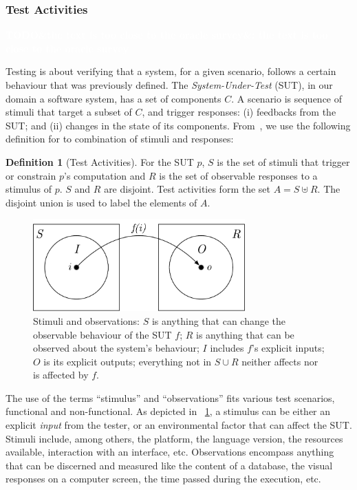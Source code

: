 \documentclass[a4paper,11pt]{sdm_internship}
\newcommand{\todo}[1]{\colorbox{Red!75}{\textcolor{white}{\textbf{TODO\ifx&#1&\else: #1\fi}}}}
\theoremstyle{definition}
\newtheorem{definition}{Definition}[section]
\begin{document}
\subsubsection{Test Activities}%
\label{sssec:test_activities}
\todo{the text is too close to the oracle survey}

Testing is about verifying that a system, for a given scenario, follows a certain behaviour that was previously defined.
The \emph{System-Under-Test} (SUT), in our domain a software system, has a set of components $C$.
A scenario is sequence of stimuli that target a subset of $C$, and trigger responses: (i) feedbacks from the SUT\@; and (ii) changes in the state of its components.
From~\cite{barr2015oracle}, we use the following definition for to combination of stimuli and responses:

\begin{definition}[Test Activities]
  For the SUT $p$, $S$ is the set of stimuli that trigger or constrain $p$'s computation and $R$ is the set of observable responses to a stimulus of $p$.
  $S$ and $R$ are disjoint.
  Test activities form the set $A = S\uplus{}R$.
  The disjoint union is used to label the elements of $A$.
\end{definition}

\begin{figure}
  \centering
  \includegraphics[width=22em]{stim_and_obs}
  \caption{Stimuli and observations: $S$ is anything that can change the observable behaviour of the SUT $f$; $R$ is anything that can be observed about the system's behaviour; $I$ includes $f$'s explicit inputs; $O$ is its explicit outputs; everything not in $S \cup R$ neither affects nor is affected by $f$.}%
  \label{fig:test_activity}
\end{figure}

The use of the terms ``stimulus'' and ``observations'' fits various test scenarios, functional and non-functional.
As depicted in \figurename~\ref{fig:test_activity}, a stimulus can be either an explicit \emph{input} from the tester, or an environmental factor that can affect the SUT\@.
Stimuli include, among others, the platform, the language version, the resources available, interaction with an interface, etc.
Observations encompass anything that can be discerned and measured like the content of a database, the visual responses on a computer screen, the time passed during the execution, etc.
\end{document}

